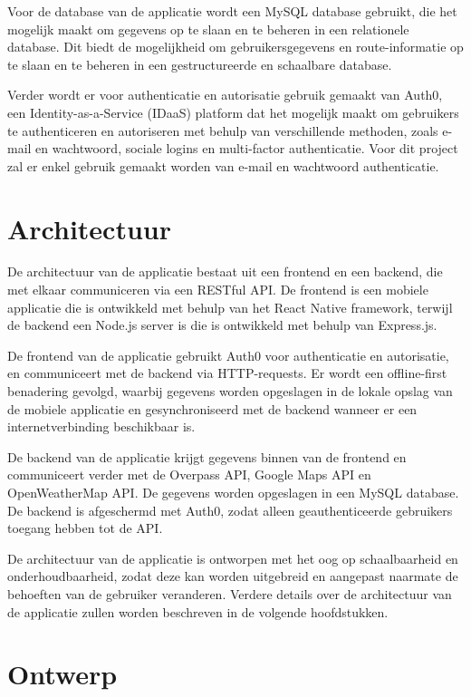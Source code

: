 Voor de database van de applicatie wordt een MySQL database gebruikt, die het mogelijk maakt om gegevens op te slaan en te beheren in een relationele database. Dit biedt de mogelijkheid om gebruikersgegevens en route-informatie op te slaan en te beheren in een gestructureerde en schaalbare database.

Verder wordt er voor authenticatie en autorisatie gebruik gemaakt van Auth0, een Identity-as-a-Service (IDaaS) platform dat het mogelijk maakt om gebruikers te authenticeren en autoriseren met behulp van verschillende methoden, zoals e-mail en wachtwoord, sociale logins en multi-factor authenticatie. Voor dit project zal er enkel gebruik gemaakt worden van e-mail en wachtwoord authenticatie.

\section{Architectuur}

De architectuur van de applicatie bestaat uit een frontend en een backend, die met elkaar communiceren via een RESTful API. De frontend is een mobiele applicatie die is ontwikkeld met behulp van het React Native framework, terwijl de backend een Node.js server is die is ontwikkeld met behulp van Express.js.

De frontend van de applicatie gebruikt Auth0 voor authenticatie en autorisatie, en communiceert met de backend via HTTP-requests. Er wordt een offline-first benadering gevolgd, waarbij gegevens worden opgeslagen in de lokale opslag van de mobiele applicatie en gesynchroniseerd met de backend wanneer er een internetverbinding beschikbaar is.

De backend van de applicatie krijgt gegevens binnen van de frontend en communiceert verder met de Overpass API, Google Maps API en OpenWeatherMap API. De gegevens worden opgeslagen in een MySQL database. De backend is afgeschermd met Auth0, zodat alleen geauthenticeerde gebruikers toegang hebben tot de API.

De architectuur van de applicatie is ontworpen met het oog op schaalbaarheid en onderhoudbaarheid, zodat deze kan worden uitgebreid en aangepast naarmate de behoeften van de gebruiker veranderen. Verdere details over de architectuur van de applicatie zullen worden beschreven in de volgende hoofdstukken.

\section{Ontwerp}

